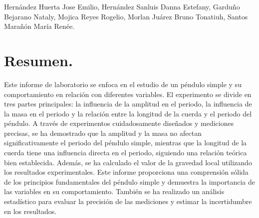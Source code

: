 \documentclass[10pt]{article}
\begin{document}
\tableofcontents
\newpage
\begin{center}
	Hernández Huerta Jose Emilio, 
	Hernández Sanluis Danna Estefany,  
	Garduño Bejarano Nataly,
	Mojica Reyes Rogelio,
	Morlan Juárez Bruno Tonatiuh,  
	Santos Marañón María Renée.
\end{center}

\section{Resumen.}
Este informe de laboratorio se enfoca en el estudio de un péndulo simple y su comportamiento en relación con diferentes variables. El experimento se divide en tres partes principales: la influencia de la amplitud en el periodo, la influencia de la masa en el periodo y la relación entre la longitud de la cuerda y el periodo del péndulo. A través de experimentos cuidadosamente diseñados y mediciones precisas, se ha demostrado que la amplitud y la masa no afectan significativamente el periodo del péndulo simple, mientras que la longitud de la cuerda tiene una influencia directa en el periodo, siguiendo una relación teórica bien establecida. Además, se ha calculado el valor de la gravedad local utilizando los resultados experimentales. Este informe proporciona una comprensión sólida de los principios fundamentales del péndulo simple y demuestra la importancia de las variables en su comportamiento. También se ha realizado un análisis estadístico para evaluar la precisión de las mediciones y estimar la incertidumbre en los resultados.
\end{document}
